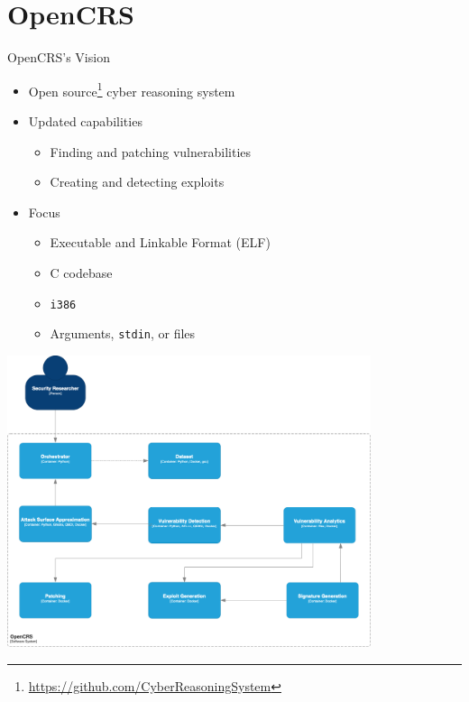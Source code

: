 \section{OpenCRS}

\begin{frame}{OpenCRS's Vision}
	\begin{itemize}
		\item Open
		      source\footnote{\href{https://github.com/CyberReasoningSystem}{https://github.com/CyberReasoningSystem}}
		      cyber reasoning system \pause
		\item Updated capabilities
		      \begin{itemize}
			      \item \color{gray} Finding and patching vulnerabilities
			      \item \color{gray} Creating and detecting exploits \pause
		      \end{itemize}
		\item Focus
		      \begin{itemize}
			      \item Executable and Linkable Format (ELF)
			      \item C codebase
			      \item \texttt{i386}
			      \item Arguments, \texttt{stdin}, or files
		      \end{itemize}
	\end{itemize}
\end{frame}

\begin{frame}
	\includegraphics[width=0.8\textwidth, center]{images/opencrs.png}
	\captionsetup{justification=centering,margin=1cm}
\end{frame}

